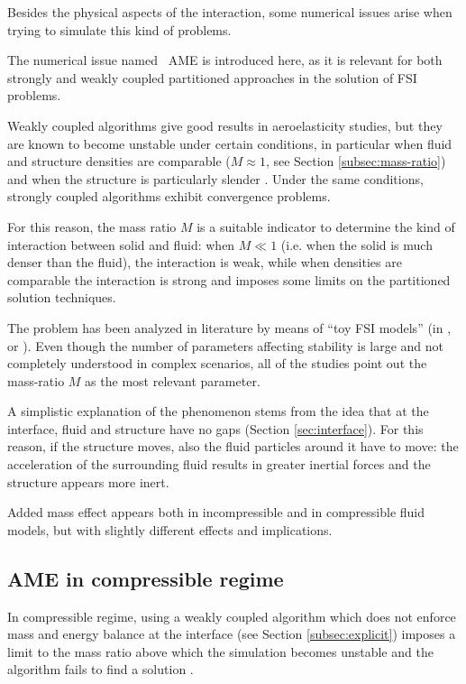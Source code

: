 Besides the physical aspects of the interaction, some numerical issues arise when trying to simulate this kind of problems.

The numerical issue named ~\ac{AME} is introduced here, as it is relevant for both strongly and weakly coupled partitioned approaches in the solution of FSI problems. 

Weakly coupled algorithms give good results in aeroelasticity studies, but they are known to become unstable under certain conditions, in particular when fluid and structure densities are comparable ($M \approx 1$, see Section \ref{subsec:mass-ratio}) and when the structure is particularly slender \cite{causin2005added}.
Under the same conditions, strongly coupled algorithms exhibit convergence problems.

For this reason, the mass ratio $M$ is a suitable indicator to determine the kind of interaction between solid and fluid: when $M \ll 1$ (i.e. when the solid is much denser than the fluid), the interaction is weak, while when densities are comparable the interaction is strong and imposes some limits on the partitioned solution techniques.

The problem has been analyzed in literature by means of ``toy FSI models'' (in \cite{causin2005added}, \cite{degroote2008stability} or \cite{mehl2016parallel}). Even though the number of parameters affecting stability is large and not completely understood in complex scenarios, all of the studies point out the mass-ratio $M$ as the most relevant parameter.

A simplistic explanation of the phenomenon stems from the idea that at the interface, fluid and structure have no gaps (Section \ref{sec:interface}). For this reason, if the structure moves, also the fluid particles around it have to move: the acceleration of the surrounding fluid results in greater inertial forces and the structure appears more inert. 

Added mass effect appears both in incompressible and in compressible fluid models, but with slightly different effects and implications.


\subsection{AME in compressible regime}  

In compressible regime, using a weakly coupled algorithm which does not enforce mass and energy balance at the interface (see Section \ref{subsec:explicit}) imposes a limit to the mass ratio above which the simulation becomes unstable and the algorithm fails to find a solution \cite{bodnar2014fluid}.

